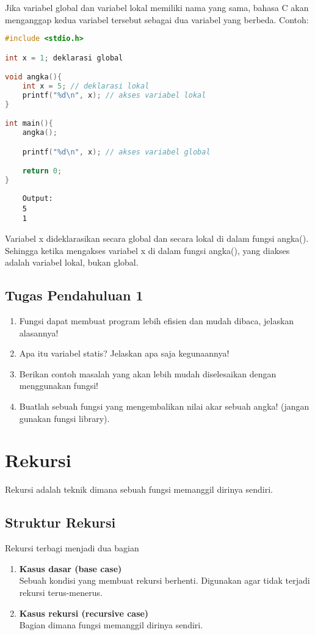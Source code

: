 Jika variabel global dan variabel lokal memiliki nama yang sama, 
bahasa C akan menganggap kedua variabel tersebut sebagai dua variabel yang berbeda.
Contoh:
\begin{lstlisting}[language=c]
#include <stdio.h>

int x = 1; deklarasi global

void angka(){
	int x = 5; // deklarasi lokal
	printf("%d\n", x); // akses variabel lokal
}

int main(){
	angka();

	printf("%d\n", x); // akses variabel global

	return 0;
}
\end{lstlisting}
\begin{verbatim}
    Output:
    5
    1
\end{verbatim}
Variabel x dideklarasikan secara global dan secara lokal di dalam fungsi angka().
Sehingga ketika mengakses variabel x di dalam fungsi angka(), yang diakses adalah variabel lokal, bukan global.

\subsection*{Tugas Pendahuluan 1}
\begin{enumerate}
    \item Fungsi dapat membuat program lebih efisien dan mudah dibaca, jelaskan alasannya!
    \item Apa itu variabel statis? Jelaskan apa saja kegunaannya!
    \item Berikan contoh masalah yang akan lebih mudah diselesaikan dengan menggunakan fungsi!
    \item Buatlah sebuah fungsi yang mengembalikan nilai akar sebuah angka! (jangan gunakan fungsi library).
\end{enumerate}

\section{Rekursi}

Rekursi adalah teknik dimana sebuah fungsi memanggil dirinya sendiri.

\subsection{Struktur Rekursi}

Rekursi terbagi menjadi dua bagian
\begin{enumerate}
    \item \textbf{Kasus dasar (base case)} \\
    Sebuah kondisi yang membuat rekursi berhenti.
    Digunakan agar tidak terjadi rekursi terus-menerus.
    \item \textbf{Kasus rekursi (recursive case)} \\
    Bagian dimana fungsi memanggil dirinya sendiri.
\end{enumerate}

